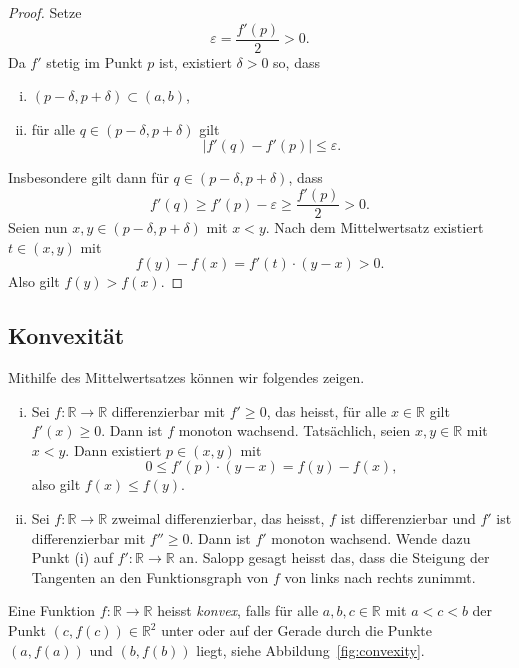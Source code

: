 \documentclass[../main.tex]{subfiles}
\begin{document}
\begin{proof}
  Setze
  \[
    \varepsilon = \frac{f'(p)}{2} > 0.
  \]
  Da $f'$ stetig im Punkt $p$ ist, existiert
  $\delta > 0$ so, dass
  \begin{enumerate}[(i)]
    \item $(p - \delta, p + \delta) \subset (a, b)$,
    \item für alle $q \in (p - \delta, p + \delta)$ 
      gilt
      \[
        |f'(q) - f'(p)| \leq \varepsilon.
      \]
  \end{enumerate}
  Insbesondere gilt dann für
  $q \in (p - \delta, p + \delta)$, dass
  \[
    f'(q) \geq f'(p) - \varepsilon \geq \frac{f'(p)}{2} > 0.
  \]
  Seien nun $x, y \in (p - \delta, p + \delta)$ mit
  $x < y$.
  Nach dem Mittelwertsatz existiert $t \in (x, y)$
  mit 
  \[f(y)  - f(x) = f'(t) \cdot (y - x) > 0. \]
  Also gilt $f(y) > f(x)$.
\end{proof}

\subsection*{Konvexität}
Mithilfe des Mittelwertsatzes können wir folgendes zeigen.
\begin{enumerate}[(i)]
  \item 
    Sei $f \colon \mathbb{R} \to \mathbb{R}$ differenzierbar
    mit $f' \geq 0$, das heisst, für alle $x \in \mathbb{R}$ 
    gilt $f'(x) \geq 0$.
    Dann ist $f$ monoton wachsend.
    Tatsächlich, seien $x, y \in \mathbb{R}$ mit $x < y$.
    Dann existiert $p \in (x, y)$ mit
    \[
      0 \leq f'(p) \cdot (y - x) = f(y) - f(x),
    \]
    also gilt $f(x) \leq f(y)$.
  \item
    Sei $f \colon \mathbb{R} \to \mathbb{R}$ zweimal
    differenzierbar, das heisst, $f$ ist differenzierbar
    und $f'$ ist differenzierbar mit $f'' \geq 0$.
    Dann ist $f'$ monoton wachsend.
    Wende dazu Punkt (i) auf
    $f' \colon\mathbb{R} \to \mathbb{R}$ 
    an.
    Salopp gesagt heisst das,
    dass die Steigung der Tangenten an den
    Funktionsgraph von $f$ von links nach rechts
    zunimmt.
\end{enumerate}

\begin{definition}
  Eine Funktion $f \colon \mathbb{R} \to \mathbb{R}$ 
  heisst \emph{konvex}, falls für alle $a, b, c \in \mathbb{R}$ 
  mit $a < c < b$ der Punkt
  $(c, f(c))
  \in \mathbb{R}^2$ unter
  oder auf der Gerade durch die Punkte
  $(a, f(a))$ und $(b, f(b))$ liegt,
  siehe Abbildung~\ref{fig:convexity}.
\end{definition}
\end{document}
